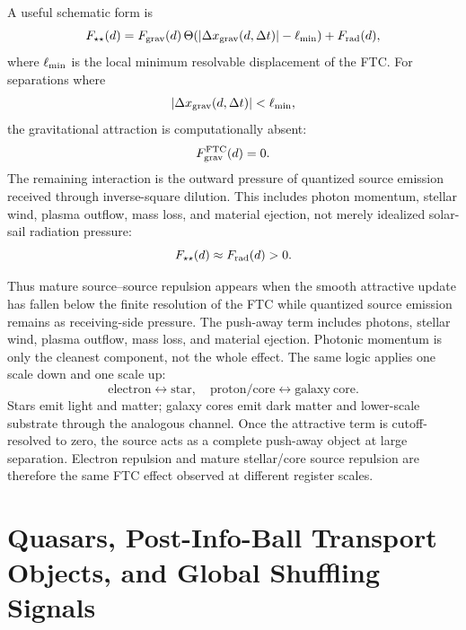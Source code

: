 \documentclass[11pt,a4paper]{article}
\begin{document}
A useful schematic form is
\begin{equation}
F_{\star\star}(d)
=
F_{\rm grav}(d)\,\Theta\!\left(|\Delta x_{\rm grav}(d,\Delta t)|-\ell_{\rm min}\right)
+
F_{\rm rad}(d),
\end{equation}
where \(\ell_{\rm min}\) is the local minimum resolvable displacement of the FTC. For separations where
\begin{equation}
|\Delta x_{\rm grav}(d,\Delta t)|<\ell_{\rm min},
\end{equation}
the gravitational attraction is computationally absent:
\begin{equation}
F_{\rm grav}^{\rm FTC}(d)=0.
\end{equation}
The remaining interaction is the outward pressure of quantized source emission received through inverse-square dilution. This includes photon momentum, stellar wind, plasma outflow, mass loss, and material ejection, not merely idealized solar-sail radiation pressure:
\begin{equation}
F_{\star\star}(d)\approx F_{\rm rad}(d)>0.
\end{equation}

Thus mature source--source repulsion appears when the smooth attractive update has fallen below the finite resolution of the FTC while quantized source emission remains as receiving-side pressure. The push-away term includes photons, stellar wind, plasma outflow, mass loss, and material ejection. Photonic momentum is only the cleanest component, not the whole effect. The same logic applies one scale down and one scale up:
\begin{equation}
\mathrm{electron} \leftrightarrow \mathrm{star},\quad
\mathrm{proton/core} \leftrightarrow \mathrm{galaxy\ core}.
\end{equation}
Stars emit light and matter; galaxy cores emit dark matter and lower-scale substrate through the analogous channel. Once the attractive term is cutoff-resolved to zero, the source acts as a complete push-away object at large separation. Electron repulsion and mature stellar/core source repulsion are therefore the same FTC effect observed at different register scales.



\section{Quasars, Post-Info-Ball Transport Objects, and Global Shuffling Signals}
\end{document}
